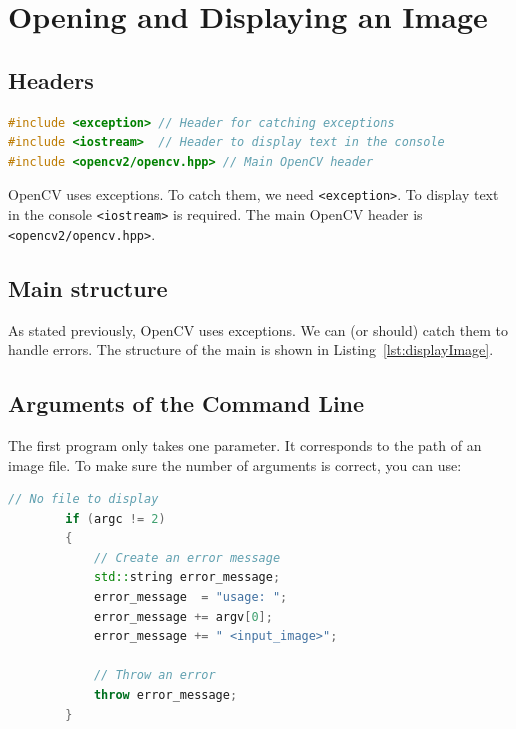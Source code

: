 \documentclass[english,a4paper,12pt,oneside]{article}
\begin{document}
\newpage
\section{Opening and Displaying an Image}


\subsection{Headers}


\begin{lstlisting}[language=c++,caption=Header files.]
#include <exception> // Header for catching exceptions
#include <iostream>  // Header to display text in the console
#include <opencv2/opencv.hpp> // Main OpenCV header
\end{lstlisting}

OpenCV uses exceptions. To catch them, we need \verb+<exception>+. 
To display text in the console \verb+<iostream>+ is required. 
The main OpenCV header is \verb+<opencv2/opencv.hpp>+.


\subsection{Main structure}

As stated previously, OpenCV uses exceptions. 
We can (or should) catch them to handle errors. 
The structure of the main is shown in Listing~\ref{lst:displayImage}.




\subsection{Arguments of the Command Line}

The first program only takes one parameter. 
It corresponds to the path of an image file. To make sure the number of arguments is correct, you can use:

 \begin{lstlisting}[language=c++,caption=Checking the number of command line arguments.]
       // No file to display
        if (argc != 2)
        {
            // Create an error message
            std::string error_message;
            error_message  = "usage: ";
            error_message += argv[0];
            error_message += " <input_image>";

            // Throw an error
            throw error_message;
        }
\end{lstlisting}
\end{document}
